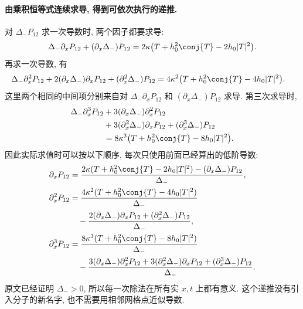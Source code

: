 \paragraph{由乘积恒等式连续求导, 得到可依次执行的递推.}
对 $\Delta_-P_{12}$ 求一次导数时, 两个因子都要求导:
\[
\Delta_-\partial_xP_{12}
+(\partial_x\Delta_-)P_{12}
=2\kappa\bigl(T+h_0^2\conj{T}-2h_0|T|^2\bigr).
\]
再求一次导数, 有
\begin{align*}
\Delta_-\partial_x^2P_{12}
+2(\partial_x\Delta_-)\partial_xP_{12}
+(\partial_x^2\Delta_-)P_{12}
&=4\kappa^2
\bigl(T+h_0^2\conj{T}-4h_0|T|^2\bigr).
\end{align*}
这里两个相同的中间项分别来自对 $\Delta_-\partial_xP_{12}$ 和 $(\partial_x\Delta_-)P_{12}$ 求导. 第三次求导时,
\begin{align*}
\Delta_-\partial_x^3P_{12}
&+3(\partial_x\Delta_-)\partial_x^2P_{12}\\
&+3(\partial_x^2\Delta_-)\partial_xP_{12}
+(\partial_x^3\Delta_-)P_{12}\\
&=8\kappa^3
\bigl(T+h_0^2\conj{T}-8h_0|T|^2\bigr).
\end{align*}
因此实际求值时可以按以下顺序, 每次只使用前面已经算出的低阶导数:
\begin{align*}
\partial_xP_{12}
&=\dfrac{2\kappa(T+h_0^2\conj{T}-2h_0|T|^2)
-(\partial_x\Delta_-)P_{12}}{\Delta_-},\\
\partial_x^2P_{12}
&=\dfrac{4\kappa^2(T+h_0^2\conj{T}-4h_0|T|^2)}{\Delta_-}\\
&\quad-\dfrac{2(\partial_x\Delta_-)\partial_xP_{12}
+(\partial_x^2\Delta_-)P_{12}}{\Delta_-},\\
\partial_x^3P_{12}
&=\dfrac{8\kappa^3(T+h_0^2\conj{T}-8h_0|T|^2)}{\Delta_-}\\
&\quad-\dfrac{3(\partial_x\Delta_-)\partial_x^2P_{12}
+3(\partial_x^2\Delta_-)\partial_xP_{12}
+(\partial_x^3\Delta_-)P_{12}}{\Delta_-}.
\end{align*}
原文已经证明 $\Delta_->0$, 所以每一次除法在所有实 $x,t$ 上都有意义. 这个递推没有引入分子的新名字, 也不需要用相邻网格点近似导数.

